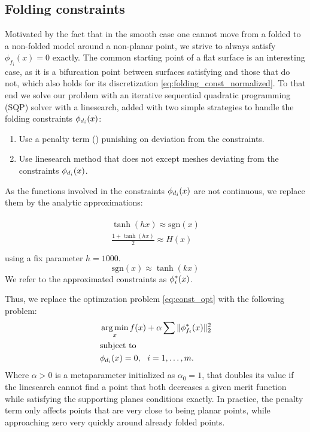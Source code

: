 \subsection{Folding constraints}
Motivated by the fact that in the smooth case one cannot move from a folded to a non-folded model around a non-planar point, we strive to always satisfy $\phi_{f_i}(x) = 0$ exactly. The common starting point of a flat surface is an interesting case, as it is a bifurcation point between surfaces satisfying  and those that do not, which also holds for its discretization \eqref{eq:folding_const_normalized}. To that end we solve our problem with an iterative sequential quadratic programming (SQP) solver with a linesearch, added with two simple strategies to handle the folding constraints $\phi_{d_i}(x)$:
\begin{enumerate}
	\item Use a penalty term (\cite{nocedal}) punishing on deviation from the constraints. \label{opt:penalty}
	\item Use linesearch method that does not except meshes deviating from the constraints $\phi_{d_i}(x)$.
\end{enumerate}
As the functions involved in the constraints $\phi_{d_i}(x)$ are not continuous, we replace them by the analytic approximations:

\begin{align} 
\begin{split}\label{eq:const_inner}
\tanh(hx) \approx \text{sgn}(x) \\
\frac{1+\tanh(hx)}{2} \approx H(x)\\
\end{split}
\end{align}
using a fix parameter $h=1000$.
\begin{equation}
\text{sgn}(x) \approx \tanh(kx)
\end{equation}
We refer to the approximated constraints as $\phi^*_i(x)$.

Thus, we replace the optimzation problem \eqref{eq:const_opt} with the following problem:
\begin{equation} \label{eq:const_opt_penalty}
\begin{aligned}
& \operatorname*{arg\,min}_x f(x) + \alpha \sum \|\phi^*_{f_i}(x)\|_2^2 \\
& \textrm{subject to} \\
& \phi_{d_i}(x) = 0, \ \  i = 1, \ldots, m. \\ 
\end{aligned}
\end{equation}
Where $\alpha > 0$ is a metaparameter initialized as $\alpha_0 = 1$, that doubles its value if the linesearch cannot find a point that both decreases a given merit function while satisfying the supporting planes conditions exactly. In practice, the penalty term only affects points that are very close to being planar points, while approaching zero very quickly around already folded points.

